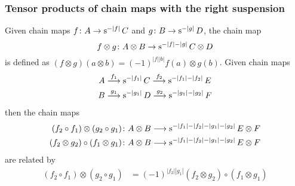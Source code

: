 \subsubsection{Tensor products of chain maps with the right suspension} Given chain maps $f\colon A\to \operatorname{s}^{-|f|}C$ and $g\colon B\to \operatorname{s}^{-|g|}D$, the chain map
\[
	f\otimes g\colon A\otimes B\to \operatorname{s}^{-|f|-|g|}C\otimes D
\]
is defined as $(f\otimes g)(a\otimes b) = (-1)^{|f||b|} f(a)\otimes g(b)$. Given chain maps
\begin{align*}
	A & \overset{f_1}{\longrightarrow} \operatorname{s}^{-|f_1|} C \overset{f_2}{\longrightarrow} \operatorname{s}^{-|f_1|-|f_2|} E \\
	B & \overset{g_1}{\longrightarrow} \operatorname{s}^{-|g_1|} D \overset{g_2}{\longrightarrow} \operatorname{s}^{-|g_1|-|g_2|} F \\
\end{align*}
then the chain maps
\begin{align*}
(f_2\circ f_1)\otimes (g_2\circ g_1)\colon &A\otimes B\longrightarrow \operatorname{s}^{-|f_1|-|f_2|-|g_1|-|g_2|}E\otimes F
\\
(f_2\otimes g_2)\circ (f_1\otimes g_1)\colon &A\otimes B\longrightarrow \operatorname{s}^{-|f_1|-|f_2|-|g_1|-|g_2|}E\otimes F
\end{align*}
 are related by
\begin{align*}
	(f_2\circ f_1)\otimes (g_2\circ g_1) &= (-1)^{|f_2||g_1|}(f_2\otimes g_2)\circ (f_1\otimes g_1)
\end{align*}

